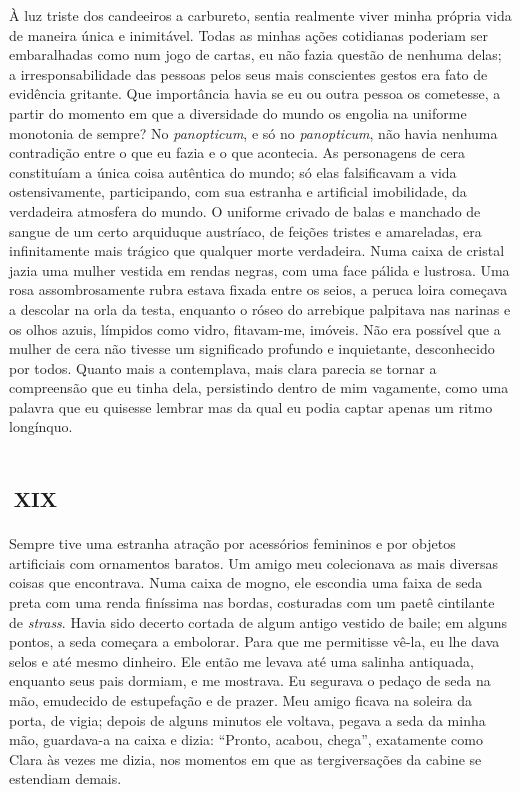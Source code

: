 À luz triste dos candeeiros a carbureto, sentia realmente viver minha própria vida de maneira única e inimitável. Todas as minhas ações cotidianas poderiam ser embaralhadas como num jogo de cartas, eu não fazia questão de nenhuma delas; a irresponsabilidade das pessoas pelos seus mais conscientes gestos era fato de evidência gritante. Que importância havia se eu ou outra pessoa os cometesse, a partir do momento em que a diversidade do mundo os engolia na uniforme monotonia de sempre? No \textit{panopticum}, e só no \textit{panopticum}, não havia nenhuma contradição entre o que eu fazia e o que acontecia. As personagens de cera constituíam a única coisa autêntica do mundo; só elas falsificavam a vida ostensivamente, participando, com sua estranha e artificial imobilidade, da verdadeira atmosfera do mundo. O uniforme crivado de balas e manchado de sangue de um certo arquiduque austríaco, de feições tristes e amareladas, era infinitamente mais trágico que qualquer morte verdadeira. Numa caixa de cristal jazia uma mulher vestida em rendas negras, com uma face pálida e lustrosa. Uma rosa assombrosamente rubra estava fixada entre os seios, a peruca loira começava a descolar na orla da testa, enquanto o róseo do arrebique palpitava nas narinas e os olhos azuis, límpidos como vidro, fitavam-me, imóveis. Não era possível que a mulher de cera não tivesse um significado profundo e inquietante, desconhecido por todos. Quanto mais a contemplava, mais clara parecia se tornar a compreensão que eu tinha dela, persistindo dentro de mim vagamente, como uma palavra que eu quisesse lembrar mas da qual eu podia captar apenas um ritmo longínquo.


\chapter*{\small{}\,\Large\centering\textsc{xix}\,\small{}}

Sempre tive uma estranha atração por acessórios femininos e por objetos artificiais com ornamentos baratos. Um amigo meu colecionava as mais diversas coisas que encontrava. Numa caixa de mogno, ele escondia uma faixa de seda preta com uma renda finíssima nas bordas, costuradas com um paetê cintilante de \textit{strass}. Havia sido decerto cortada de algum antigo vestido de baile; em alguns pontos, a seda começara a embolorar. Para que me permitisse vê-la, eu lhe dava selos e até mesmo dinheiro. Ele então me levava até uma salinha antiquada, enquanto seus pais dormiam, e me mostrava. Eu segurava o pedaço de seda na mão, emudecido de estupefação e de prazer. Meu amigo ficava na soleira da porta, de vigia; depois de alguns minutos ele voltava, pegava a seda da minha mão, guardava-a na caixa e dizia: ``Pronto, acabou, chega'', exatamente como Clara às vezes me dizia, nos momentos em que as tergiversações da cabine se estendiam demais.


